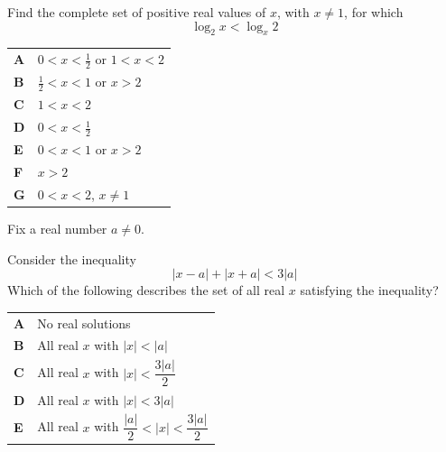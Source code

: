 \documentclass[11pt,a4paper]{article}
\begin{document}
\thispagestyle{djspaper}
\djsFrontMatter
\thispagestyle{djspaper}
\vspace*{8pt}
\begin{enumerate}[label=\textbf{\arabic*.},leftmargin=*,itemsep=0pt,start=1]
Find the complete set of positive real values of $x$, with $x \neq 1$, for which\[\log_2 x < \log_x 2\]

\par\vspace*{12pt}
\begin{tabularx}{\linewidth}{@{}>{\bfseries}l Y@{}}
A &
$0<x<\frac{1}{2}$ or $1<x<2$
\\[0.8em]
B &
$\frac{1}{2}<x<1$ or $x>2$
\\[0.8em]
C &
$1<x<2$
\\[0.8em]
D &
$0<x<\frac{1}{2}$
\\[0.8em]
E &
$0<x<1$ or $x>2$
\\[0.8em]
F &
$x>2$
\\[0.8em]
G &
$0<x<2$, $x \neq 1$
\\
\end{tabularx}
\end{enumerate}
\clearpage
\thispagestyle{djspaper}
\vspace*{8pt}
\begin{enumerate}[label=\textbf{\arabic*.},leftmargin=*,itemsep=0pt,start=2]
\questionitem[Inequalities]
Fix a real number $a\ne 0$.

Consider the inequality \[ |x-a|+|x+a|<3|a| \] Which of the following describes the set of all real $x$ satisfying the inequality?

\par\vspace*{12pt}
\begin{tabularx}{\linewidth}{@{}>{\bfseries}l Y@{}}
A &
No real solutions
\\[0.8em]
B &
All real $x$ with $|x|<|a|$
\\[0.8em]
C &
All real $x$ with $|x|<\dfrac{3|a|}{2}$
\\[0.8em]
D &
All real $x$ with $|x|<3|a|$
\\[0.8em]
E &
All real $x$ with $\dfrac{|a|}{2}<|x|<\dfrac{3|a|}{2}$
\\
\end{tabularx}
\end{enumerate}
\end{document}
